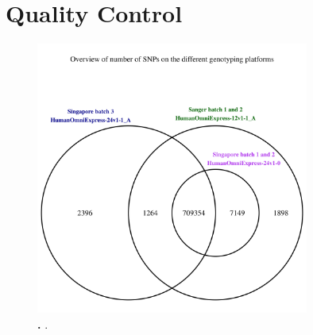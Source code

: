 \section{Quality Control}

\begin{figure}[hbtp]
	\centering
	\includegraphics[trim = 0mm 0mm 0mm 20mm, clip, width=0.8\textwidth]{FiguresTablesSupplement/Venn_genotyping_batches.png}
	\caption{\textbf{.} .}
 	\label{fig:probeoverlap}
\end{figure}
